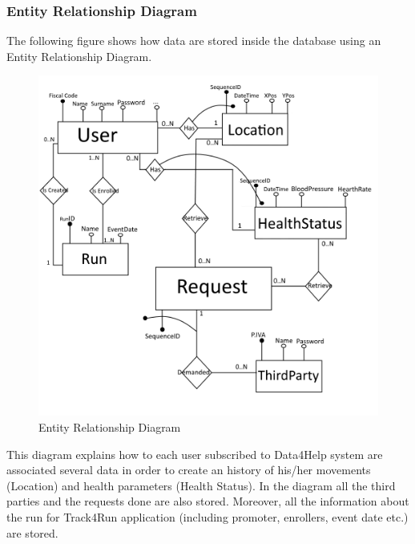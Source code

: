 \clearpage

\subsubsection{Entity Relationship Diagram}
The following figure shows how data are stored inside the database using an Entity Relationship Diagram.
\begin{figure}[H]
\centering
\includegraphics[scale=0.65]{Images/ERDiagram.png}
\caption{Entity Relationship Diagram}
\end{figure}
\noindent
This diagram explains how to each user subscribed to Data4Help system are associated several data in order to create an history of his/her movements (Location) and health parameters (Health Status). In the diagram all the third parties and the requests done are also stored. Moreover, all the information about the run for Track4Run application (including promoter, enrollers, event date etc.) are stored.

\newpage
